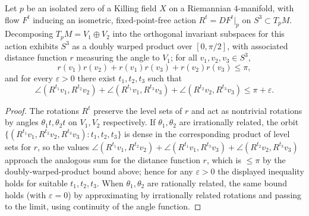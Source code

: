 \begin{lemma}
  \label{lem:pet-ch8-isolated-zero-orbit-angle-bound}
  Let $p$ be an isolated zero of a Killing field $X$ on a Riemannian
  $4$-manifold, with flow $F^t$ inducing an isometric, fixed-point-free action
  $R^t=DF^t|_p$ on $S^3\subset T_pM$. Decomposing $T_pM=V_1\oplus V_2$ into the
  orthogonal invariant subspaces for this action exhibits $S^3$ as a doubly
  warped product over $[0,\pi/2]$, with associated distance function $r$
  measuring the angle to $V_1$; for all $v_1,v_2,v_3\in S^3$,
  \[
    r(v_1)r(v_2)+r(v_1)r(v_3)+r(v_2)r(v_3)\le\pi,
  \]
  and for every $\varepsilon>0$ there exist $t_1,t_2,t_3$ such that
  \[
    \angle(R^{t_1}v_1,R^{t_2}v_2)+\angle(R^{t_1}v_1,R^{t_3}v_3)+\angle(R^{t_2}v_2,R^{t_3}v_3)\le\pi+\varepsilon.
  \]
\end{lemma}
\begin{proof}
  The rotations $R^t$ preserve the level sets of $r$ and act as nontrivial
  rotations by angles $\theta_1t,\theta_2t$ on $V_1,V_2$ respectively. If
  $\theta_1,\theta_2$ are irrationally related, the orbit $\{(R^{t_1}v_1,R^{t_2}v_2,R^{t_3}v_3):t_1,t_2,t_3\}$
  is dense in the corresponding product of level sets for $r$, so the values
  $\angle(R^{t_1}v_1,R^{t_2}v_2)+\angle(R^{t_1}v_1,R^{t_3}v_3)+\angle(R^{t_2}v_2,R^{t_3}v_3)$
  approach the analogous sum for the distance function $r$, which is $\le\pi$
  by the doubly-warped-product bound above; hence for any $\varepsilon>0$ the
  displayed inequality holds for suitable $t_1,t_2,t_3$. When $\theta_1,\theta_2$
  are rationally related, the same bound holds (with $\varepsilon=0$) by
  approximating by irrationally related rotations and passing to the limit,
  using continuity of the angle function.
\end{proof}


